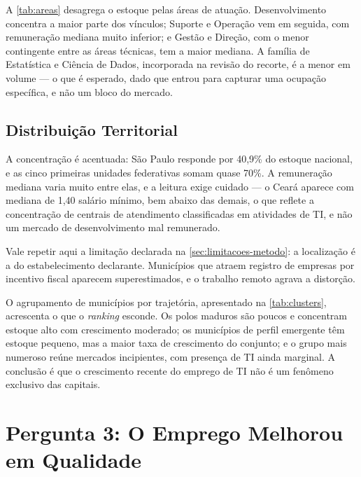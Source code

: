 

A \autoref{tab:areas} desagrega o estoque pelas áreas de atuação. Desenvolvimento concentra a maior parte dos vínculos; Suporte e Operação vem em seguida, com remuneração mediana muito inferior; e Gestão e Direção, com o menor contingente entre as áreas técnicas, tem a maior mediana. A família de Estatística e Ciência de Dados, incorporada na revisão do recorte, é a menor em volume --- o que é esperado, dado que entrou para capturar uma ocupação específica, e não um bloco do mercado.

\subsection{Distribuição Territorial}



A concentração é acentuada: São Paulo responde por 40,9\% do estoque nacional, e as cinco primeiras unidades federativas somam quase 70\%. A remuneração mediana varia muito entre elas, e a leitura exige cuidado --- o Ceará aparece com mediana de 1,40 salário mínimo, bem abaixo das demais, o que reflete a concentração de centrais de atendimento classificadas em atividades de TI, e não um mercado de desenvolvimento mal remunerado.

Vale repetir aqui a limitação declarada na \autoref{sec:limitacoes-metodo}: a localização é a do estabelecimento declarante. Municípios que atraem registro de empresas por incentivo fiscal aparecem superestimados, e o trabalho remoto agrava a distorção.



O agrupamento de municípios por trajetória, apresentado na \autoref{tab:clusters}, acrescenta o que o \textit{ranking} esconde. Os polos maduros são poucos e concentram estoque alto com crescimento moderado; os municípios de perfil emergente têm estoque pequeno, mas a maior taxa de crescimento do conjunto; e o grupo mais numeroso reúne mercados incipientes, com presença de TI ainda marginal. A conclusão é que o crescimento recente do emprego de TI não é um fenômeno exclusivo das capitais.

\section{Pergunta 3: O Emprego Melhorou em Qualidade}
\label{sec:resultado-q3}

